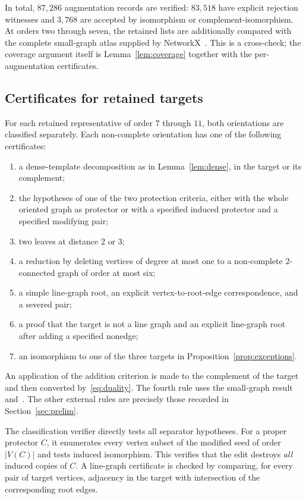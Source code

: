 \documentclass[11pt,reqno]{amsart}
\theoremstyle{definition}
\theoremstyle{remark}
\begin{document}
In total, $87,286$ augmentation records are verified: $83,518$ have explicit rejection witnesses and $3,768$ are accepted by isomorphism or complement-isomorphism. At orders two through seven, the retained lists are additionally compared with the complete small-graph atlas supplied by NetworkX~\cite{NetworkX}. This is a cross-check; the coverage argument itself is Lemma~\ref{lem:coverage} together with the per-augmentation certificates.

\subsection{Certificates for retained targets}

For each retained representative of order $7$ through $11$, both orientations are classified separately. Each non-complete orientation has one of the following certificates:
\begin{enumerate}
\item a dense-template decomposition as in Lemma~\ref{lem:dense}, in the target or its complement;
\item the hypotheses of one of the two protection criteria, either with the whole oriented graph as protector or with a specified induced protector and a specified modifying pair;
\item two leaves at distance $2$ or $3$;
\item a reduction by deleting vertices of degree at most one to a non-complete $2$-connected graph of order at most six;
\item a simple line-graph root, an explicit vertex-to-root-edge correspondence, and a severed pair;
\item a proof that the target is not a line graph and an explicit line-graph root after adding a specified nonedge;
\item an isomorphism to one of the three targets in Proposition~\ref{prop:exceptions}.
\end{enumerate}
An application of the addition criterion is made to the complement of the target and then converted by~\eqref{eq:duality}. The fourth rule uses the small-graph result and~\cite[Corollary~4.2]{FHHS}. The other external rules are precisely those recorded in Section~\ref{sec:prelim}.

The classification verifier directly tests all separator hypotheses. For a proper protector $C$, it enumerates every vertex subset of the modified seed of order $|V(C)|$ and tests induced isomorphism. This verifies that the edit destroys \emph{all} induced copies of $C$. A line-graph certificate is checked by comparing, for every pair of target vertices, adjacency in the target with intersection of the corresponding root edges.
\end{document}
